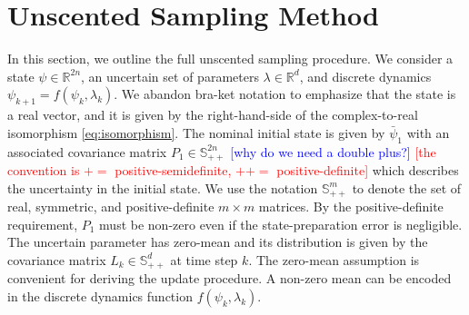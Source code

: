 \section{Unscented Sampling Method}
\label{appendix:unscented}
In this section, we outline the full unscented sampling procedure.
We consider a state $\psi \in \mathbb{R}^{2n}$, 
an uncertain set of parameters $\lambda\in \mathbb{R}^{d}$, and discrete dynamics
$\psi_{k + 1} = f(\psi_{k}, \lambda_{k})$.
We abandon bra-ket notation to emphasize that
the state is a real vector, and it is given by the right-hand-side of the
complex-to-real isomorphism \eqref{eq:isomorphism}.
The nominal initial state is given by $\bar{\psi}_{1}$ with an associated
covariance matrix $P_{1} \in \mathbb{S}_{++}^{2n}$
\textcolor{blue}{[why do we need a double plus?]}
\textcolor{red}{[the convention is $+ =$ positive-semidefinite, $++ =$ positive-definite]}
which describes the uncertainty in the initial state.
We use the notation $\mathbb{S}_{++}^{m}$ to denote the
set of real, symmetric, and positive-definite $m \times m$ matrices.
By the positive-definite requirement, $P_{1}$ must be non-zero even if the state-preparation error
is negligible.
The uncertain parameter has zero-mean
and its distribution is given by the covariance matrix
$L_{k} \in \mathbb{S}_{++}^{d}$ at time step $k$. The zero-mean assumption
is convenient for deriving the update procedure. A non-zero mean can be encoded
in the discrete dynamics function $f(\psi_{k}, \lambda_{k})$.

